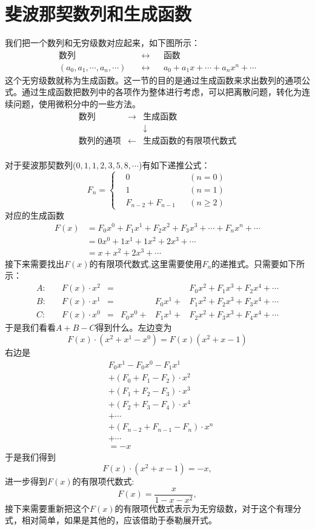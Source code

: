 \documentclass[cn]{elegantbook}
\begin{document}
\chapter{斐波那契数列和生成函数}
我们把一个数列和无穷级数对应起来，如下图所示：
\[
\begin{aligned}
\text{数列}\quad & \longleftrightarrow && \text{函数} \\
(a_0, a_1, \cdots, a_n, \cdots) \quad & \longleftrightarrow && a_0 + a_1x + \cdots + a_nx^n+\cdots
\end{aligned}
\]
这个无穷级数就称为生成函数。这一节的目的是通过生成函数来求出数列的通项公式。通过生成函数把数列中的各项作为整体进行考虑，可以把离散问题，转化为连续问题，使用微积分中的一些方法。
\[
\begin{array}{ccc}
\text{数列} & \longrightarrow & \text{生成函数} \\
&& \downarrow \\
\text{数列的通项} &\longleftarrow & \text{生成函数的有限项代数式} \\
\end{array}
\]

对于斐波那契数列($0,1,1,2,3,5,8,\cdots$)有如下递推公式：
\[
F_n = \left\{
\begin{aligned}
&0 &&(n=0)\\
&1 &&(n=1)\\
&F_{n-2} + F_{n-1}&&(n \ge 2)
\end{aligned}\right.
\]
对应的生成函数
\[
\begin{aligned}
F(x) &= F_0x^0 + F_1x^1 + F_2x^2 + F_3x^3 + \cdots + F_nx^n + \cdots\\
&= 0x^0 + 1x^1 + 1x^2 + 2x^3 + \cdots \\
&= x + x^2 + 2x^3 + \cdots
\end{aligned}
\]
接下来需要找出$F(x)$的有限项代数式,这里需要使用$F_n$的递推式。只需要如下所示：
\[
\begin{aligned}
A:\quad &F(x) \cdot x^2 &=& &&F_0x^2 + F_1x^3 + F_2x^4+\cdots \\
B:\quad &F(x) \cdot x^1 &=& &F_0x^1 + &F_1x^2 + F_2x^3+F_3x^4+\cdots \\
C:\quad &F(x) \cdot x^0 &=& F_0x^0 + &F_1x^1 + &F_2x^2+F_3x^3+F_4x^4+\cdots
\end{aligned}
\]
于是我们看看$A+B-C$得到什么。左边变为
\[
F(x)\cdot(x^2 + x^1-x^0) = F(x)(x^2+x-1)
\]
右边是
\[
\begin{aligned}
&F_0x^1 - F_0x^0 - F_1x^1 \\
&+(F_0 + F_1 - F_2) \cdot x^2 \\
&+(F_1 + F_2 - F_3) \cdot x^3 \\
&+(F_2 + F_3 - F_4) \cdot x^4 \\
&+ \cdots \\
&+(F_{n-2} + F_{n-1} - F_n) \cdot x^n \\
&+ \cdots \\
&=-x
\end{aligned}
\]
于是我们得到
\[
F(x) \cdot(x^2+x-1) = -x,
\]
进一步得到$F(x)$的有限项代数式:
\[
F(x) = \frac{x}{1-x-x^2},
\]
接下来需要重新把这个$F(x)$的有限项代数式表示为无穷级数，对于这个有理分式，相对简单，如果是其他的，应该借助于泰勒展开式。
\end{document}
